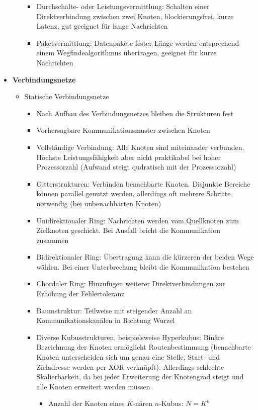 \begin{itemize}
\begin{itemize}
		\begin{itemize}
			\item Durchschalte- oder Leistungsvermittlung: Schalten einer Direktverbindung zwischen zwei Knoten, blockierungsfrei, kurze Latenz, gut geeignet für lange Nachrichten
			\item Paketvermittlung: Datenpakete fester Länge werden entsprechend einem Wegfindealgorithmus übertragen, geeignet für kurze Nachrichten
		\end{itemize}
	\end{itemize}
	\item \textbf{Verbindungsnetze}
	\begin{itemize}
		\item Statische Verbindungsnetze
		\begin{itemize}
			\item Nach Aufbau des Verbindungsnetzes bleiben die Strukturen fest
			\item Vorhersagbare Kommunikationsmuster zwischen Knoten
			\item Vollständige Verbindung: Alle Knoten sind miteinander verbunden. Höchste Leistungsfähigkeit aber nicht praktikabel bei hoher Prozessorzahl (Aufwand steigt qudratisch mit der Prozessorzahl)
			\item Gitterstrukturen: Verbinden benachbarte Knoten. Disjunkte Bereiche können parallel genutzt werden, allerdings oft mehrere Schritte notwendig (bei unbenachbarten Knoten)
			\item Unidirektionaler Ring: Nachrichten werden vom Quellknoten zum Zielknoten geschickt. Bei Ausfall bricht die Kommunikation zusammen
			\item Bidirektionaler Ring: Übertragung kann die kürzeren der beiden Wege wählen. Bei einer Unterbrechung bleibt die Kommunikation bestehen
			\item Chordaler Ring: Hinzufügen weiterer Direktverbindungen zur Erhöhung der Fehlertoleranz
			\item Baumstruktur: Teilweise mit steigender Anzahl an Kommunikationskanälen in Richtung Wurzel
			\item Diverse Kubusstrukturen, beispielsweise Hyperkubus: Binäre Bezeichnung der Knoten ermöglicht Routenbestimmung (benachbarte Knoten unterscheiden sich um genau eine Stelle, Start- und Zieladresse werden per XOR verknüpft). Allerdings schlechte Skalierbarkeit, da bei jeder Erweiterung der Knotengrad steigt und alle Knoten erweitert werden müssen
			\begin{itemize}
				\item Anzahl der Knoten eines \(K\)-nären \(n\)-Kubus: \(N = K^n\)

\end{itemize}
\end{itemize}
\end{itemize}
\end{itemize}
